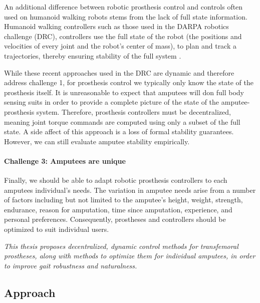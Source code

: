 An additional difference between robotic prosthesis control and controls often
used on humanoid walking robots stems from the lack of full state information.
Humanoid walking controllers such as those used in the DARPA robotics challenge
(DRC), controllers use the full state of the robot (\ie the positions and
velocities of every joint and the robot's center of mass), to plan and track a
trajectories, thereby ensuring stability of the full system
\citep{feng2015optimization, kuindersma2014efficiently,
englsberger2014trajectory}.

While these recent approaches used in the DRC are dynamic and therefore address
challenge 1, for prosthesis control we typically only know the state of the
prosthesis itself. It is unreasonable to expect that amputees will don full body
sensing suits in order to provide a complete picture of the state of the
amputee-prosthesis system. Therefore, prosthesis controllers must be
decentralized, meaning joint torque commands are computed using only a subset of
the full state. A side affect of this approach is a loss of formal stability
guarantees. However, we can still evaluate amputee stability empirically.

\paragraph{Challenge 3: Amputees are unique}

Finally, we should be able to adapt robotic prosthesis controllers to each
amputees individual's needs. The variation in amputee needs arise from a number
of factors including but not limited to the amputee's height, weight, strength,
endurance, reason for amputation, time since amputation, experience, and
personal preferences. Consequently, prostheses and controllers should be
optimized to suit individual users.

\vspace{2ex}
\begin{fullwidth} \emph{This thesis proposes decentralized, dynamic control
methods for transfemoral prostheses, along with methods to optimize them for
individual amputees, in order to improve gait robustness and naturalness.}
\end{fullwidth}

\subsection{Approach}

